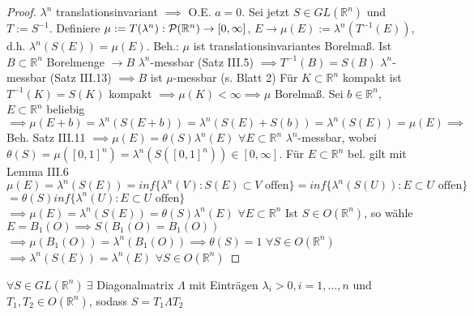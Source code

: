 \documentclass[11pt,a4paper,fleqn,openany]{report}
\begin{document}
    \begin{proof}
      $\lambda^n$ translationsinvariant $\implies$ O.E. $a=0$. \newline
      Sei jetzt $S\in GL(\mathbb{R}^n)$ und $T:=S^{-1}$. \newline
      Definiere $\mu := T(\lambda^n): \mathcal{P}(\mathbb{R}^n) \rightarrow [0,\infty]$, $E \to \mu(E) := \lambda^n(T^{-1}(E))$, d.h.\newline
      $\lambda^n(S(E)) = \mu(E)$. \newline
      Beh.: $\mu$ ist translationsinvariantes Borelmaß. \newline
      Ist $B\subset\mathbb{R}^n$ Borelmenge $\rightarrow B$ $\lambda^n$-messbar (Satz III.5) $\implies T^{-1}(B) = S(B)$ $\lambda^n$-messbar (Satz III.13) $\implies B$ ist $\mu$-messbar (s. Blatt 2) \newline
      Für $K\subset\mathbb{R}^n$ kompakt ist $T^{-1}(K) = S(K)$ kompakt $\implies \mu(K) < \infty \implies \mu$ Borelmaß. \newline
      Sei $b\in\mathbb{R}^n$, $E\subset\mathbb{R}^n$ beliebig \newline 
      $\implies \mu(E+b) = \lambda^n(S(E+b)) = \lambda^n(S(E) + S(b)) = \lambda^n(S(E)) = \mu(E) \implies$ Beh. \newline
      Satz III.11 $\implies \mu(E) = \theta(S) \lambda^n(E)$ $\forall E\subset\mathbb{R}^n$ $\lambda^n$-messbar, wobei $\theta(S) = \mu([0,1]^n) = \lambda^n(S([0,1]^n)) \in [0,\infty]$. \newline
      Für $E\subset\mathbb{R}^n$ bel. gilt mit Lemma III.6 \newline
      $\mu(E) = \lambda^n(S(E)) = inf\{\lambda^n(V): S(E)\subset V \text{ offen}\} = inf\{\lambda^n(S(U)): E\subset U \text{ offen}\}$ \newline $= \theta(S) inf\{\lambda^n(U): E\subset U \text{ offen}\}$ \newline
      $\implies \mu(E) = \lambda^n(S(E)) = \theta(S) \lambda^n(E)$ $\forall E\subset\mathbb{R}^n$ \newline
      Ist $S\in O(\mathbb{R}^n)$, so wähle $E = B_1(O) \implies S(B_1(O) = B_1(O))$ \newline
      $\implies \mu(B_1(O)) = \lambda^n(B_1(O)) \implies \theta(S) = 1$ $\forall S\in O(\mathbb{R}^n)$ \newline
      $\implies \lambda^n(S(E)) = \lambda^n(E)$ $\forall S \in O(\mathbb{R}^n)$
    \end{proof}

    \begin{lemma}[Polarzerlegung]
      $\forall S \in GL(\mathbb{R}^n) \ \exists$ Diagonalmatrix $\Lambda$ mit Einträgen $\lambda_i > 0, i=1,...,n$ und \\
      $T_1, T_2 \in O(\mathbb{R}^n)$, sodass $S = T_1 \Lambda T_2$ 
    \end{lemma}
\end{document}

